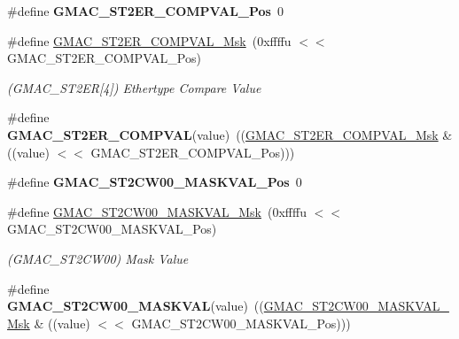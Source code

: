 \begin{DoxyCompactItemize}
\mbox{\label{group__SAMV71__GMAC_gacf2d9754029ec355acc06b76712665b5}} 
\#define {\bfseries G\+M\+A\+C\+\_\+\+S\+T2\+E\+R\+\_\+\+C\+O\+M\+P\+V\+A\+L\+\_\+\+Pos}~0
\item 
\mbox{\label{group__SAMV71__GMAC_gabbb9dd848f8465fdaeefca5e6d6e2db4}} 
\#define \mbox{\hyperlink{group__SAMV71__GMAC_gabbb9dd848f8465fdaeefca5e6d6e2db4}{G\+M\+A\+C\+\_\+\+S\+T2\+E\+R\+\_\+\+C\+O\+M\+P\+V\+A\+L\+\_\+\+Msk}}~(0xffffu $<$$<$ G\+M\+A\+C\+\_\+\+S\+T2\+E\+R\+\_\+\+C\+O\+M\+P\+V\+A\+L\+\_\+\+Pos)
\begin{DoxyCompactList}\small\item\em (G\+M\+A\+C\+\_\+\+S\+T2\+ER\mbox{[}4\mbox{]}) Ethertype Compare Value \end{DoxyCompactList}\item 
\mbox{\label{group__SAMV71__GMAC_gad3fc996e5079029f4969fae449674df5}} 
\#define {\bfseries G\+M\+A\+C\+\_\+\+S\+T2\+E\+R\+\_\+\+C\+O\+M\+P\+V\+AL}(value)~((\mbox{\hyperlink{group__SAMV71__GMAC_gabbb9dd848f8465fdaeefca5e6d6e2db4}{G\+M\+A\+C\+\_\+\+S\+T2\+E\+R\+\_\+\+C\+O\+M\+P\+V\+A\+L\+\_\+\+Msk}} \& ((value) $<$$<$ G\+M\+A\+C\+\_\+\+S\+T2\+E\+R\+\_\+\+C\+O\+M\+P\+V\+A\+L\+\_\+\+Pos)))
\item 
\mbox{\label{group__SAMV71__GMAC_ga5e9a9354ff32c27fff15670b9102ef44}} 
\#define {\bfseries G\+M\+A\+C\+\_\+\+S\+T2\+C\+W00\+\_\+\+M\+A\+S\+K\+V\+A\+L\+\_\+\+Pos}~0
\item 
\mbox{\label{group__SAMV71__GMAC_ga921e08a338e2caa2e273336374d631bc}} 
\#define \mbox{\hyperlink{group__SAMV71__GMAC_ga921e08a338e2caa2e273336374d631bc}{G\+M\+A\+C\+\_\+\+S\+T2\+C\+W00\+\_\+\+M\+A\+S\+K\+V\+A\+L\+\_\+\+Msk}}~(0xffffu $<$$<$ G\+M\+A\+C\+\_\+\+S\+T2\+C\+W00\+\_\+\+M\+A\+S\+K\+V\+A\+L\+\_\+\+Pos)
\begin{DoxyCompactList}\small\item\em (G\+M\+A\+C\+\_\+\+S\+T2\+C\+W00) Mask Value \end{DoxyCompactList}\item 
\mbox{\label{group__SAMV71__GMAC_ga6ea1a534f2e31888c2a415fb516a5ad3}} 
\#define {\bfseries G\+M\+A\+C\+\_\+\+S\+T2\+C\+W00\+\_\+\+M\+A\+S\+K\+V\+AL}(value)~((\mbox{\hyperlink{group__SAMV71__GMAC_ga921e08a338e2caa2e273336374d631bc}{G\+M\+A\+C\+\_\+\+S\+T2\+C\+W00\+\_\+\+M\+A\+S\+K\+V\+A\+L\+\_\+\+Msk}} \& ((value) $<$$<$ G\+M\+A\+C\+\_\+\+S\+T2\+C\+W00\+\_\+\+M\+A\+S\+K\+V\+A\+L\+\_\+\+Pos)))

\end{DoxyCompactItemize}
